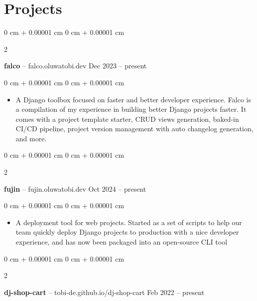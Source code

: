 \documentclass[10pt, letterpaper]{article}
\newenvironment{highlights}{
    \begin{itemize}[
        topsep=0.10 cm,
        parsep=0.10 cm,
        partopsep=0pt,
        itemsep=0pt,
        leftmargin=0 cm + 10pt
    ]
}{
    \end{itemize}
} %
\newenvironment{onecolentry}{
    \begin{adjustwidth}{
        0 cm + 0.00001 cm
    }{
        0 cm + 0.00001 cm
    }
}{
    \end{adjustwidth}
} %
\newenvironment{twocolentry}[2][]{
    \onecolentry
    \def\secondColumn{#2}
    \setcolumnwidth{\fill, 4.5 cm}
    \begin{paracol}{2}
}{
    \switchcolumn \raggedleft \secondColumn
    \end{paracol}
    \endonecolentry
} %
\begin{document}
    
    \section{Projects}



        
        \begin{twocolentry}{
            Dec 2023 – present
        }
            \textbf{falco} -- falco.oluwatobi.dev\end{twocolentry}

        \vspace{0.10 cm}
        \begin{onecolentry}
            \begin{highlights}
                \item A Django toolbox focused on faster and better developer experience. Falco is a compilation of my experience in building better Django projects faster. It comes with a project template starter, CRUD views generation, baked-in CI/CD pipeline, project version management with auto changelog generation, and more.
            \end{highlights}
        \end{onecolentry}


        \vspace{0.2 cm}

        \begin{twocolentry}{
            Oct 2024 – present
        }
            \textbf{fujin} -- fujin.oluwatobi.dev\end{twocolentry}

        \vspace{0.10 cm}
        \begin{onecolentry}
            \begin{highlights}
                \item A deployment tool for web projects. Started as a set of scripts to help our team quickly deploy Django projects to production with a nice developer experience, and has now been packaged into an open-source CLI tool
            \end{highlights}
        \end{onecolentry}


        \vspace{0.2 cm}

        \begin{twocolentry}{
            Feb 2022 – present
        }
            \textbf{dj-shop-cart} -- tobi-de.github.io/dj-shop-cart\end{twocolentry}
\end{document}
